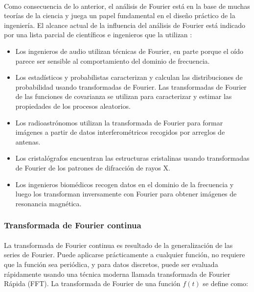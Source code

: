 \documentclass[12pt]{article}
\begin{document}
\paragraph{}
Como consecuencia de lo anterior, el análisis de Fourier está en la base de muchas teorías de la ciencia y juega un papel fundamental en el diseño práctico de la ingeniería. El alcance actual de la influencia del análisis de Fourier está indicado por una lista parcial de científicos e ingenieros que la utilizan \cite{robert}:

\begin{itemize}
\item{Los ingenieros de audio utilizan técnicas de Fourier, en parte porque el oído parece ser sensible al comportamiento del dominio de frecuencia.}
\item{Los estadísticos y probabilistas caracterizan y calculan las distribuciones de probabilidad usando transformadas de Fourier. Las transformadas de Fourier de las funciones de covarianza se utilizan para caracterizar y estimar las propiedades de los procesos aleatorios.}
\item{Los radioastrónomos utilizan la transformada de Fourier para formar imágenes a partir de datos interferométricos recogidos por arreglos de antenas.}
\item{Los cristalógrafos encuentran las estructuras cristalinas usando transformadas de Fourier de los patrones de difracción de rayos X.}
\item{Los ingenieros biomédicos recogen datos en el dominio de la frecuencia y luego los transforman
inversamente con Fourier para obtener imágenes de resonancia magnética.}
\end{itemize}

\subsubsection{Transformada de Fourier continua}
\paragraph{}
La transformada de Fourier continua es resultado de la generalización de las series de Fourier. Puede aplicarse prácticamente a cualquier función, no requiere que la función sea periódica, y para datos discretos, puede ser evaluada rápidamente usando una técnica moderna llamada transformada de Fourier Rápida (FFT). La transformada de Fourier de una función $f(t)$ se define \cite{anthony} como:
\end{document}
